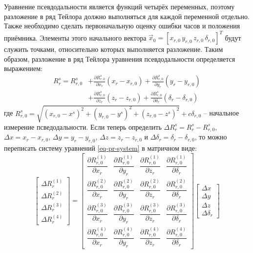 Уравнение псевдодальности является функций четырёх переменных, поэтому разложение в ряд Тейлора должно выполняться для каждой переменной отдельно.
Также необходимо сделать первоначальную оценку ошибки часов и положения приёмника.
Элементы этого начального вектора $\vec{x}_0=\left[x_{r,0}\,y_{r,0}\,z_{r,0}\,\delta_{r,0}\right]^T$ будут служить точками, относительно которых выполняется разложение. 
Таким образом, разложение в ряд Тейлора уравнения псевдодальности определяется выражением:
\begin{equation}
\label{eq-pr-taylor}
\begin{aligned}
R_r^s=R_{r,0}^s&+\frac{\partial R_{r,0}^s}{\partial x_r}(x_r-x_{r,0})+\frac{\partial R_{r,0}^s}{\partial y_r}(y_r-y_{r,0}) \\
&+\frac{\partial R_{r,0}^s}{\partial z_r}(z_r-z_{r,0})+\frac{\partial R_{r,0}^s}{\partial \delta_r}(\delta_r-\delta_{r,0})    
\end{aligned}
\end{equation}  
где
$R_{r,0}^s=\sqrt{(x_{r,0}-x^s)^2+(y_{r,0}-y^s)^2+(z_{r,0}-z^s)^2}+c\delta_{r,0}$ -- начальное измерение псведодальности. 
Если теперь определить $\Delta R_r^s=R_r^s-R_{r,0}^s$, $\Delta x=x_r-x_{r,0}$, $\Delta y=y_r-y_{r,0}$, $\Delta z=z_r-z_{r,0}$ и $\Delta \delta_r=\delta_r-\delta_{r,0}$, то можно переписать систему уравнений \eqref{eq-pr-system} в матричном виде:
\begin{equation}
\label{eq-pr-system2}
\begin{bmatrix}
\Delta R_r^{(1)} \\ 
\Delta R_r^{(2)} \\ 
\Delta R_r^{(3)} \\
\Delta R_r^{(4)} 
\end{bmatrix} = \begin{bmatrix}
\dfrac{\partial R_{r,0}^{(1)}}{\partial x_r}&\dfrac{\partial R_{r,0}^{(1)}}{\partial y_r}&\dfrac{\partial R_{r,0}^{(1)}}{\partial z_r}&\dfrac{\partial R_{r,0}^{(1)}}{\partial \delta_r} \\[1em] 
\dfrac{\partial R_{r,0}^{(2)}}{\partial x_r}&\dfrac{\partial R_{r,0}^{(2)}}{\partial y_r}&\dfrac{\partial R_{r,0}^{(2)}}{\partial z_r}&\dfrac{\partial R_{r,0}^{(2)}}{\partial \delta_r} \\[1em]
\dfrac{\partial R_{r,0}^{(3)}}{\partial x_r}&\dfrac{\partial R_{r,0}^{(3)}}{\partial y_r}&\dfrac{\partial R_{r,0}^{(3)}}{\partial z_r}&\dfrac{\partial R_{r,0}^{(3)}}{\partial \delta_r} \\[1em]
\dfrac{\partial R_{r,0}^{(4)}}{\partial x_r}&\dfrac{\partial R_{r,0}^{(4)}}{\partial y_r}&\dfrac{\partial R_{r,0}^{(4)}}{\partial z_r}&\dfrac{\partial R_{r,0}^{(4)}}{\partial \delta_r} 
\end{bmatrix} \begin{bmatrix}
\Delta x \\ 
\Delta y \\ 
\Delta z \\
\Delta \delta_r   
\end{bmatrix}    
\end{equation}    
